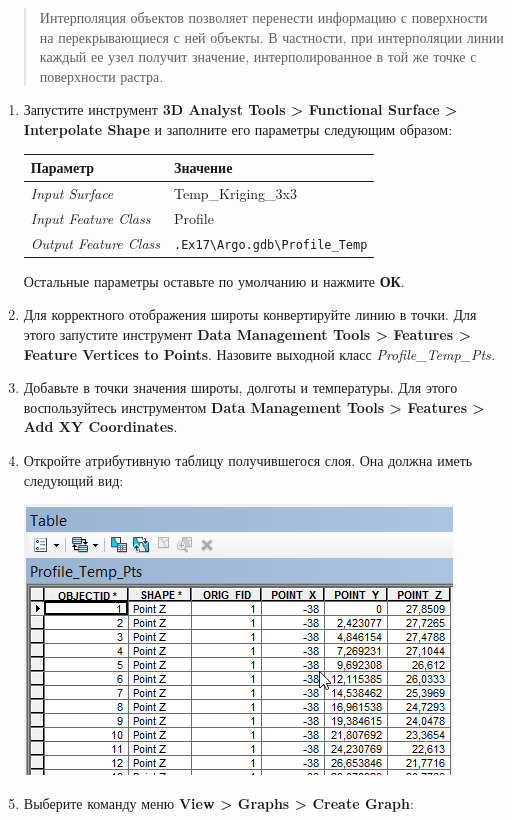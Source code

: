 \documentclass[]{book}
\theoremstyle{definition}
\theoremstyle{definition}
\theoremstyle{definition}
\theoremstyle{remark}
\begin{document}
\begin{quote}
Интерполяция объектов позволяет перенести информацию с поверхности на
перекрывающиеся с ней объекты. В частности, при интерполяции линии
каждый ее узел получит значение, интерполированное в той же точке с
поверхности растра.
\end{quote}

\begin{enumerate}
\def\labelenumi{\arabic{enumi}.}
\item
  Запустите инструмент \textbf{3D Analyst Tools \textgreater{}
  Functional Surface \textgreater{} Interpolate Shape} и заполните его
  параметры следующим образом:

  \begin{longtable}[]{@{}ll@{}}
  \toprule
  Параметр & Значение\tabularnewline
  \midrule
  \endhead
  \emph{Input Surface} & Temp\_Kriging\_3x3\tabularnewline
  \emph{Input Feature Class} & Profile\tabularnewline
  \emph{Output Feature Class} &
  \texttt{.Ex17\textbackslash{}Argo.gdb\textbackslash{}Profile\_Temp}\tabularnewline
  \bottomrule
  \end{longtable}

  Остальные параметры оставьте по умолчанию и нажмите \textbf{ОК}.
\item
  Для корректного отображения широты конвертируйте линию в точки. Для
  этого запустите инструмент \textbf{Data Management Tools
  \textgreater{} Features \textgreater{} Feature Vertices to Points}.
  Назовите выходной класс \emph{Profile\_Temp\_Pts.}
\item
  Добавьте в точки значения широты, долготы и температуры. Для этого
  воспользуйтесь инструментом \textbf{Data Management Tools
  \textgreater{} Features \textgreater{} Add XY Coordinates}.
\item
  Откройте атрибутивную таблицу получившегося слоя. Она должна иметь
  следующий вид:

  \includegraphics{images/Ex17/image20.png}
\item
  Выберите команду меню \textbf{View \textgreater{} Graphs
  \textgreater{} Create Graph}:


\end{enumerate}
\end{document}
